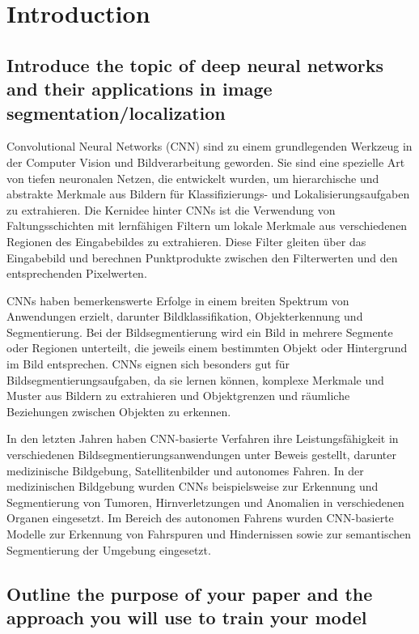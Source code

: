 


\chapter{Introduction}

    \section{Introduce the topic of deep neural networks and their applications in image segmentation/localization}

        Convolutional Neural Networks (CNN) sind zu einem grundlegenden Werkzeug in der
        Computer Vision und Bildverarbeitung geworden. Sie sind eine spezielle Art von tiefen neuronalen Netzen,
        die entwickelt wurden, um hierarchische und abstrakte Merkmale aus Bildern für Klassifizierungs- und
        Lokalisierungsaufgaben zu extrahieren. Die Kernidee hinter CNNs ist die Verwendung von Faltungsschichten
        mit lernfähigen Filtern um lokale Merkmale aus verschiedenen Regionen des Eingabebildes zu extrahieren.
        Diese Filter gleiten über das Eingabebild und berechnen Punktprodukte zwischen den Filterwerten und den
        entsprechenden Pixelwerten.

        CNNs haben bemerkenswerte Erfolge in einem breiten Spektrum von Anwendungen erzielt, darunter
        Bildklassifikation, Objekterkennung und Segmentierung. Bei der Bildsegmentierung wird ein Bild in mehrere
        Segmente oder Regionen unterteilt, die jeweils einem bestimmten Objekt oder Hintergrund im Bild entsprechen.
        CNNs eignen sich besonders gut für Bildsegmentierungsaufgaben, da sie lernen können, komplexe Merkmale und
        Muster aus Bildern zu extrahieren und Objektgrenzen und räumliche Beziehungen zwischen Objekten zu erkennen.

        In den letzten Jahren haben CNN-basierte Verfahren ihre Leistungsfähigkeit in verschiedenen
        Bildsegmentierungsanwendungen unter Beweis gestellt, darunter medizinische Bildgebung, Satellitenbilder und
        autonomes Fahren. In der medizinischen Bildgebung wurden CNNs beispielsweise zur Erkennung und Segmentierung
        von Tumoren, Hirnverletzungen und Anomalien in verschiedenen Organen eingesetzt. Im Bereich des autonomen
        Fahrens wurden CNN-basierte Modelle zur Erkennung von Fahrspuren und Hindernissen sowie zur semantischen
        Segmentierung der Umgebung eingesetzt.

    \section{Outline the purpose of your paper and the approach you will use to train your model}


